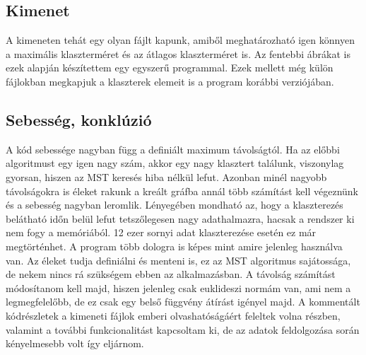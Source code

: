 \documentclass[a4paper,12pt]{article}
\begin{document}
\subsection{ Kimenet}
\par A kimeneten tehát egy olyan fájlt kapunk, amiből meghatározható igen könnyen a maximális klaszterméret és az átlagos klaszterméret is.
Az fentebbi ábrákat is ezek alapján készítettem egy egyszerű programmal. Ezek mellett még külön fájlokban megkapjuk a klaszterek elemeit is
a program korábbi verziójában.
\subsection{ Sebesség, konklúzió}
\par A kód sebessége nagyban függ a definiált maximum távolságtól. Ha az előbbi algoritmust egy igen nagy szám,
akkor egy nagy klasztert találunk, viszonylag gyorsan, hiszen az MST keresés hiba nélkül lefut. Azonban minél nagyobb távolságokra is
éleket rakunk a kreált gráfba annál több számítást kell végeznünk és a sebesség nagyban leromlik. Lényegében mondható az, hogy a
klaszterezés belátható időn belül lefut tetszőlegesen nagy adathalmazra, hacsak a rendszer ki nem fogy a memóriából. 12 ezer sornyi adat 
klaszterezése esetén ez már megtörténhet. A program több dologra is képes mint amire jelenleg használva van. Az éleket tudja definiálni és
menteni is, ez az MST algoritmus sajátossága, de nekem nincs rá szükségem ebben az alkalmazásban. A távolság számítást módosítanom kell majd,
hiszen jelenleg csak euklideszi normám van, ami nem a legmegfelelőbb, de ez csak egy belső függvény átírást igényel majd. A kommentált kódrészletek 
a kimeneti fájlok emberi olvashatóságáért feleltek volna részben, valamint a további funkcionalitást kapcsoltam ki, de az adatok feldolgozása során
 kényelmesebb volt így eljárnom.
\end{document}
